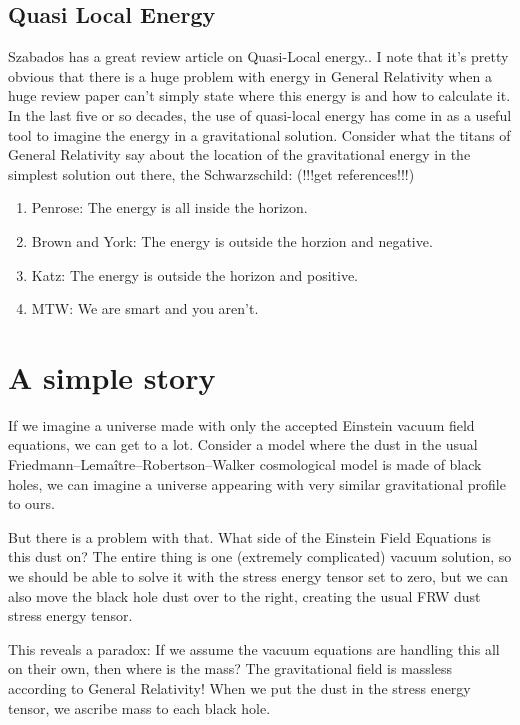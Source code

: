 \documentclass[../rzero]{subfiles}
\begin{document}
  \subsection{Quasi Local Energy}
  Szabados has a great review article on Quasi-Local energy.\cite{szabadosQuasiLocalEnergyMomentumAngular2009}. I note that it's pretty obvious that there is a huge problem with energy in General Relativity when a huge review paper can't simply state where this energy is and how to calculate it. 
  In the last five or so decades, the use of quasi-local energy has come in as a useful tool to imagine the energy in a gravitational solution. Consider what the titans of General Relativity say about the location of the gravitational energy in the simplest solution out there, the Schwarzschild:
  (!!!get references!!!) 
  \begin{enumerate}
  	\item Penrose: The energy is all inside the horizon.
  	\item Brown and York: The energy is outside the horzion and negative.
  	\item Katz: The energy is outside the horizon and positive. 
  	\item MTW: We are smart and you aren't. 
  \end{enumerate} 



\section{A simple story}
If we imagine a universe made with only the accepted Einstein vacuum field equations, we can get to a lot. Consider a model where the dust in the usual Friedmann–Lemaître–Robertson–Walker cosmological model is made of black holes, we can imagine a universe appearing with very similar gravitational profile to ours. 

But there is a problem with that. What side of the Einstein Field Equations is this dust on? The entire thing is one (extremely complicated) vacuum solution, so we should be able to solve it with the stress energy tensor set to zero, but we can also move the black hole dust over to the right, creating the usual FRW dust stress energy tensor. 

This reveals a paradox: If we assume the vacuum equations are handling this all on their own, then where is the mass? The gravitational field is massless according to General Relativity! When we put the dust in the stress energy tensor, we ascribe mass to each black hole. 
\end{document}
